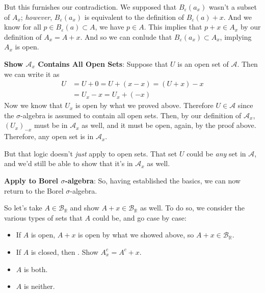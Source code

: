 \documentclass[12pt]{article}
\theoremstyle{plain}
\theoremstyle{definition}
\theoremstyle{remark}
\begin{document}
\begin{enumerate}
But this furnishes our contradiction.  We supposed that $B_\varepsilon(a_x)$ wasn't a subset of $A_x$; \emph{however}, $B_\varepsilon(a_x)$ is equivalent to the definition of $B_\varepsilon(a) + x$. And we know for all $p \in B_\varepsilon(a)\subset A$, we have $p\in A$. This implies that $p+x \in A_x$ by our definition of $A_x = A+x$. And so we can conlude that $B_\varepsilon(a_x)\subset A_x$, implying $A_x$ is open.

\textbf{Show $\mathscr{A}_x$ Contains All Open Sets}: Suppose that $U$ is an open set of $\mathscr{A}$. Then we can write it as
\begin{align*}
    U &= U + 0 = U + (x-x) = (U + x) - x \\
    &= U_x - x = U_x + (-x)
\end{align*}
Now we know that $U_x$ is open by what we proved above. Therefore $U\in\mathscr{A}$ since the $\sigma$-algebra is assumed to contain all open sets. Then, by our definition of $\mathscr{A}_x$, $\left(U_x\right)_{-x}$ must be in $\mathscr{A}_x$ as well, and it must be open, again, by the proof above. Therefore, any open set is in $\mathscr{A}_x$.

But that logic doesn't \emph{just} apply to open sets. That set $U$ could be \emph{any} set in $\mathscr{A}$, and we'd still be able to show that it's in $\mathscr{A}_x$ as well.

\textbf{Apply to Borel $\sigma$-algebra}: So, having established the basics, we can now return to the Borel $\sigma$-algebra. 

So let's take $A\in\mathscr{B}_\mathbb{R}$ and show $A+x \in \mathscr{B}_\mathbb{R}$ as well. To do so, we consider the various types of sets that $A$ could be, and go case by case:
\begin{itemize}
    \item If $A$ is open, $A+x$ is open by what we showed above, so $A+x\in\mathscr{B}_\mathbb{R}$.
    \item If $A$ is closed, then . Show $A_x^c = A^c + x$.
    \item $A$ is both.
    \item $A$ is neither.
\end{itemize}

\end{enumerate}
\end{document}
